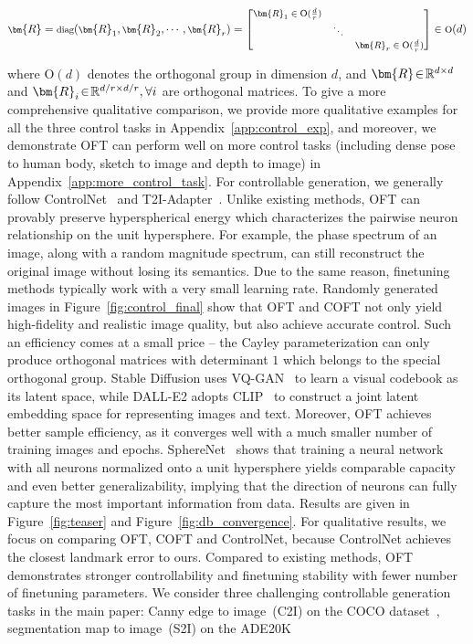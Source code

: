\begin{itemize}[leftmargin=*,nosep]
\begin{itemize}[leftmargin=*,nosep]
\begin{equation}
    \footnotesize
    \bm{R}=\text{diag}(\bm{R}_1,\bm{R}_2,\cdots,\bm{R}_r)=\begin{bmatrix}
    \bm{R}_1\in \text{O}(\frac{d}{r}) &  &\\
    &\ddots & \\
    & & \bm{R}_r\in \text{O}(\frac{d}{r})
    \end{bmatrix}\in \text{O}(d)
\end{equation}

where $\text{O}(d)$ denotes the orthogonal group in dimension $d$, and $\thickmuskip=2mu \medmuskip=2mu \bm{R}\in\mathbb{R}^{d\times d}$ and $\thickmuskip=2mu \medmuskip=2mu \bm{R}_i\in\mathbb{R}^{d/r\times d/r},\forall i$ are orthogonal matrices. To give a more comprehensive qualitative comparison, we provide more qualitative examples for all the three control tasks in Appendix~\ref{app:control_exp}, and moreover, we demonstrate OFT can perform well on more control tasks (including dense pose to human body, sketch to image and depth to image) in Appendix~\ref{app:more_control_task}. For controllable generation, we generally follow  ControlNet~\cite{zhang2023adding} and T2I-Adapter~\cite{mou2023t2i}. Unlike existing methods, OFT can provably preserve hyperspherical energy which characterizes the pairwise neuron relationship on the unit hypersphere. For example, the phase spectrum of an image, along with a random magnitude spectrum, can still reconstruct the original image without losing its semantics. Due to the same reason, finetuning methods typically work with a very small learning rate. Randomly generated images in Figure~\ref{fig:control_final} show that OFT and COFT not only yield high-fidelity and realistic image quality, but also achieve accurate control. Such an efficiency comes at a small price -- the Cayley parameterization can only produce orthogonal matrices with determinant $1$ which belongs to the special orthogonal group. Stable Diffusion uses VQ-GAN~\cite{esser2021taming} to learn a visual codebook as its latent space, while DALL-E2 adopts CLIP~\cite{radford2021learning} to construct a joint latent embedding space for representing images and text. Moreover, OFT achieves better sample efficiency, as it converges well with a much smaller number of training images and epochs. SphereNet~\cite{liu2017deep} shows that training a neural network with all neurons normalized onto a unit hypersphere yields comparable capacity and even better generalizability, implying that the direction of neurons can fully capture the most important information from data. Results are given in Figure~\ref{fig:teaser} and Figure~\ref{fig:db_convergence}. For qualitative results, we focus on comparing OFT, COFT and ControlNet, because ControlNet achieves the closest landmark error to ours. Compared to existing methods, OFT demonstrates stronger controllability and finetuning stability with fewer number of finetuning parameters. We consider three challenging controllable generation tasks in the main paper: Canny edge to image~(C2I) on the COCO dataset~\cite{lin2014microsoft}, segmentation map to image~(S2I) on the ADE20K 
\end{itemize}
\end{itemize}
